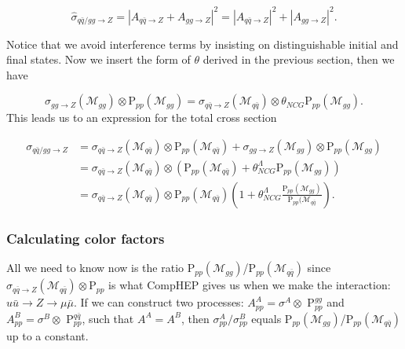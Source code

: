 \begin{equation}
\hat \sigma_{q \bar q/gg \rightarrow Z} = |A_{q \bar q \rightarrow Z} + A_{gg \rightarrow Z}|^{2}=|A_{q \bar q \rightarrow Z}|^{2}+|A_{gg \rightarrow Z}|^{2}.
\end{equation}

Notice that we avoid interference terms by insisting on distinguishable initial and final states. Now we insert the form of $\theta$ derived in the previous section, then we have

\begin{equation}
	\sigma_{gg\rightarrow Z} (\mathcal{M}_{gg}) \otimes \textrm{P}_{pp}(\mathcal{M}_{gg})=\sigma_{q \bar q\rightarrow Z}(\mathcal{M}_{q \bar q}) \otimes \theta_{NCG}\textrm{P}_{pp}(\mathcal{M}_{gg}).
\end{equation}
This leads us to an expression for the total cross section

\begin{align} \label{eq:qqggztotal}
\sigma_{q \bar q/gg \rightarrow Z} &= \sigma_{q \bar q \rightarrow Z} (\mathcal{M}_{q \bar q}) \otimes \textrm{P}_{pp}(\mathcal{M}_{q \bar q})+ \sigma_{gg\rightarrow Z} (\mathcal{M}_{gg}) \otimes \textrm{P}_{pp}(\mathcal{M}_{gg})\nonumber \\ 
&= \sigma_{q \bar q\rightarrow Z}(\mathcal{M}_{q \bar q}) \otimes (\textrm{P}_{pp}(\mathcal{M}_{q \bar q})+\theta_{NCG}^{\Lambda}\textrm{P}_{pp}(\mathcal{M}_{gg}))\nonumber \\ 
&= \sigma_{q \bar q\rightarrow Z}(\mathcal{M}_{q \bar q}) \otimes \textrm{P}_{pp}(\mathcal{M}_{q \bar q}) \left ( 1+\theta_{NCG}^{\Lambda}\frac{\textrm{P}_{pp}(\mathcal{M}_{gg})}{\textrm{P}_{pp}(\mathcal{M}_{q \bar q}} \right ).
\end{align}

\subsubsection{Calculating color factors}

All we need to know now is the ratio P$_{pp}(\mathcal{M}_{gg})$/P$_{pp}(\mathcal{M}_{q \bar q})$ since $ \sigma_{q \bar q\rightarrow Z}(\mathcal{M}_{q \bar q}) \otimes \textrm{P}_{pp}$ is what CompHEP gives us when we make the interaction: $u \bar u \rightarrow Z \rightarrow \mu \bar \mu $. If we can construct two processes: $A_{pp}^{A}=\sigma^{A} \otimes$ P$_{pp}^{gg}$ and $A_{pp}^{B}=\sigma^{B} \otimes$ P$_{pp}^{q \bar q}$, such that $A^{A}=A^{B}$, then $\sigma_{pp}^{A}/\sigma_{pp}^{B}$ equals  P$_{pp}(\mathcal{M}_{gg})$/P$_{pp}(\mathcal{M}_{q \bar q})$ up to a constant.

